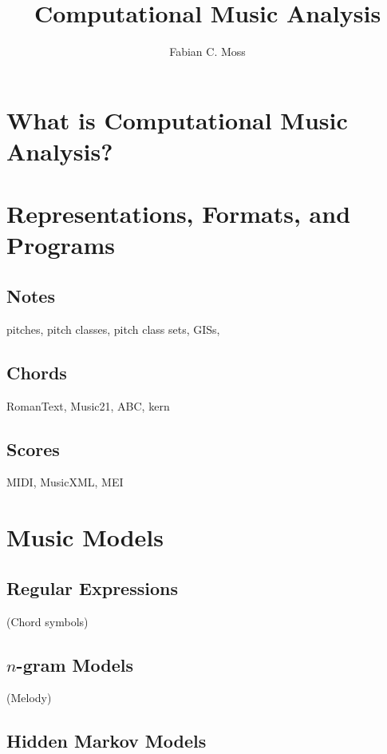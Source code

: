 \documentclass{book}
\title{Computational Music Analysis}
\author{Fabian C. Moss}
\begin{document}
\maketitle 

\tableofcontents

\chapter{What is Computational Music Analysis?}

\citep{horton_compositionality_2001}

\chapter{Representations, Formats, and Programs}

\section{Notes}

pitches, pitch classes, pitch class sets, GISs, 

\section{Chords}

RomanText, Music21, ABC, \*\*kern

\section{Scores}

MIDI, MusicXML, MEI

\chapter{Music Models}

\section{Regular Expressions}

(Chord symbols)

\section{$n$-gram Models}

(Melody)

\section{Hidden Markov Models}
\end{document}
